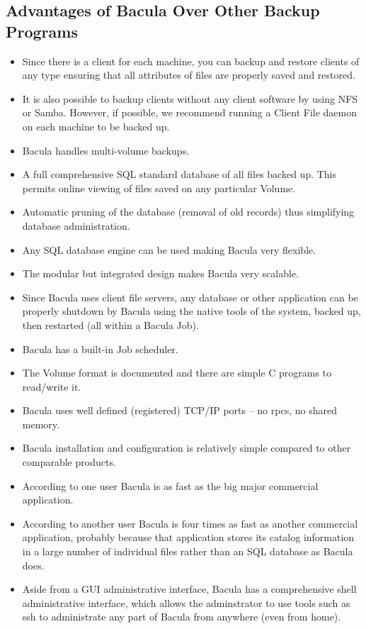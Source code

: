 \subsection*{Advantages of Bacula Over Other Backup Programs}

\begin{itemize}
\item Since there is a client for each machine, you can backup
   and restore clients of any type ensuring that all attributes
   of files are properly saved and restored.
\item It is also possible to backup clients without any client
   software by using NFS or Samba.  However, if possible, we
   recommend running a Client File daemon on each machine to be
   backed up.
\item Bacula handles multi-volume backups.  
\item A full comprehensive SQL standard database of all files backed up.  This
   permits online viewing of files saved on any particular  Volume.  
\item Automatic pruning of the database (removal of old records) thus 
   simplifying database administration.  
\item Any SQL database engine can be used making Bacula very flexible.  
\item The modular but integrated design makes Bacula very scalable.  
\item Since Bacula uses client file servers, any database or
   other application can be properly shutdown by Bacula using the
   native tools of the system, backed up, then restarted (all
   within a Bacula Job).
\item Bacula has a built-in Job scheduler.  
\item The Volume format is documented and there are simple C programs to 
   read/write it.  
\item Bacula uses well defined (registered) TCP/IP ports -- no rpcs,  no
   shared memory.  
\item Bacula installation and configuration is relatively simple compared  to
   other comparable products.  
\item According to one user Bacula is as fast as the big major commercial 
   application.  
\item According to another user Bacula is four times as fast as  another
   commercial application, probably because that application  stores its catalog
   information in a large number of individual  files rather than an SQL database
   as Bacula does.  
\item Aside from a GUI administrative interface, Bacula has a
   comprehensive shell administrative interface, which allows the
   adminstrator to use tools such as ssh to administrate any part of
   Bacula from anywhere (even from home).


\end{itemize}
